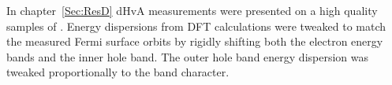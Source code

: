 
In chapter~\ref{Sec:ResD} \ac{dHvA} measurements were presented on a high quality samples of \BaFeP. Energy dispersions from \ac{DFT} calculations were tweaked to match the measured Fermi surface orbits by rigidly shifting both the electron energy bands and the inner hole band. The outer hole band energy dispersion was tweaked proportionally to the \DzTwo band character.
